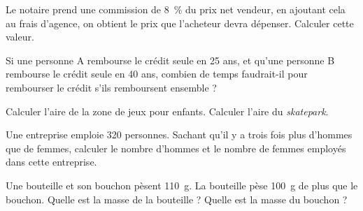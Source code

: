 \documentclass["../Cours.tex"]{subfiles}
\begin{document}
\begin{questions}
    \question Le notaire prend une commission de \qty{8}{\percent} du prix net vendeur, en ajoutant cela au frais d'agence, on obtient le prix que l'acheteur devra dépenser. Calculer cette valeur.

    \question Si une personne A rembourse le crédit seule en 25 ans, et qu'une personne B rembourse le crédit seule en 40 ans, combien de temps faudrait-il pour rembourser le crédit s'ils remboursent ensemble ?


    \begin{center}
    \end{center}

    \question Calculer l'aire de la zone de jeux pour enfants.
    \question Calculer l'aire du \textit{skatepark}.

    \exercice Une entreprise emploie 320 personnes. Sachant qu'il y a trois fois plus d'hommes que de femmes, calculer le nombre d'hommes et le nombre de femmes employés dans cette entreprise.
    
    \exercice Une bouteille et son bouchon pèsent \qty{110}{\gram}. La bouteille pèse \qty{100}{\gram} de plus que le bouchon. Quelle est la masse de la bouteille ? Quelle est la masse du bouchon ?

\end{questions}
\end{document}
